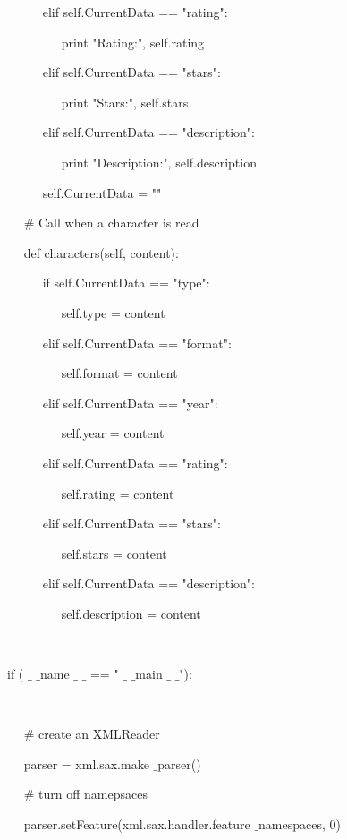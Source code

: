 \noindent 
~~~~~ elif self.CurrentData == "rating": \par
\noindent 
~~~~~~~~ print "Rating:", self.rating \par
\noindent 
~~~~~ elif self.CurrentData == "stars": \par
\noindent 
~~~~~~~~ print "Stars:", self.stars \par
\noindent 
~~~~~ elif self.CurrentData == "description": \par
\noindent 
~~~~~~~~ print "Description:", self.description \par
\noindent 
~~~~~ self.CurrentData = "" \par
\vspace{12pt}
\noindent 
~~  $  \#  $ Call when a character is read \par
\noindent 
~~ def characters(self, content): \par
\noindent 
~~~~~ if self.CurrentData == "type": \par
\noindent 
~~~~~~~~ self.type = content \par
\noindent 
~~~~~ elif self.CurrentData == "format": \par
\noindent 
~~~~~~~~ self.format = content \par
\noindent 
~~~~~ elif self.CurrentData == "year": \par
\noindent 
~~~~~~~~ self.year = content \par
\noindent 
~~~~~ elif self.CurrentData == "rating": \par
\noindent 
~~~~~~~~ self.rating = content \par
\noindent 
~~~~~ elif self.CurrentData == "stars": \par
\noindent 
~~~~~~~~ self.stars = content \par
\noindent 
~~~~~ elif self.CurrentData == "description": \par
\noindent 
~~~~~~~~ self.description = content \par
\noindent 
~  \par
\noindent 
if (  $  \_  $ $  \_  $name $  \_  $ $  \_  $ == " $  \_  $ $  \_  $main $  \_  $ $  \_  $"): \par
\noindent 
~~  \par
\noindent 
~~  $  \#  $ create an XMLReader \par
\noindent 
~~ parser = xml.sax.make $  \_  $parser() \par
\noindent 
~~  $  \#  $ turn off namepsaces \par
\noindent 
~~ parser.setFeature(xml.sax.handler.feature $  \_  $namespaces, 0) \par
